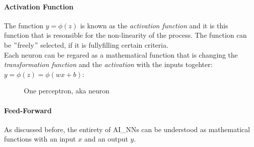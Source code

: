 \paragraph{Activation Function}
The function $y=\phi(z)$ is known as the \textit{activation function} and it is this function that is resonsible for the non-linearity of the process. The function can be $"$freely$"$ selected, if it is fullyfilling certain criteria. \\

Each neuron can be regared as a mathematical function that is changing the \textit{transformation function} and the \textit{activation} with the inputs togehter: $y=\phi(z)= \phi\left(wx+b\right)$:

\begin{figure}[h]
\centering
{}
\caption{One perceptron, aka neuron}
\end{figure}

\pagebreak
\paragraph{Feed-Forward}

As discussed before, the entirety of \glspl{AI_NN} can be understood as mathematical functions with an input $x$ and an output $y$.

